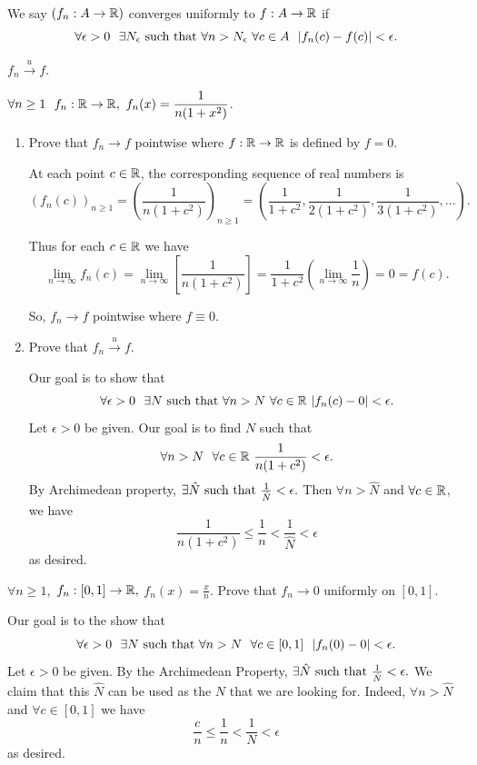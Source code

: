 \begin{definition} \leavevmode \\
    We say $(f_n: A \to \mathbb{R})$ converges uniformly to $f: A \to \mathbb{R}$ if 
    $$\forall \epsilon > 0 ~~\exists N_\epsilon \text{ such that } \forall n > N_\epsilon ~\forall c \in A ~~|f_n(c) - f(c)| < \epsilon.$$
\end{definition}

\begin{notation}
    $f_n \overset{u}{\to} f.$
\end{notation}

\begin{example}
    $\forall n \geq 1~~ f_n: \mathbb{R} \to \mathbb{R}, ~f_n(x) = \dfrac{1}{n(1+x^2)}$.

    \begin{enumerate}
        \item Prove that $f_n \to f$ pointwise where $f: \mathbb{R} \to \mathbb{R}$ is defined by $f = 0.$
        
        At each point $c \in \mathbb{R}$, the corresponding sequence of real numbers is
        $$(f_n(c))_{n \geq 1} = \left(\frac{1}{n(1+c^2)}\right)_{n\geq 1} = \left(\frac{1}{1+c^2}, \frac{1}{2(1+c^2)}, \frac{1}{3(1+c^2)}, ... \right).$$

        Thus for each $c \in \mathbb{R}$ we have
        $$\lim_{n\to \infty}f_n(c) = \lim_{n\to \infty}\left[\frac{1}{n(1+c^2)}\right] = \frac{1}{1+c^2}\left(\lim_{n\to \infty}\frac{1}{n}\right) = 0 = f(c).$$

        So, $f_n \to f$ pointwise where $f \equiv 0$.

        \item Prove that $f_n \overset{u}{\to} f.$
        
        Our goal is to show that
        $$\forall \epsilon > 0 ~~\exists N \text{ such that } \forall n > N ~\forall c \in \mathbb{R} ~|f_n(c) - 0| < \epsilon.$$
        Let $\epsilon > 0$ be given. Our goal is to find $N$ such that
        $$\forall n > N ~~\forall c \in \mathbb{R} ~\frac{1}{n(1+c^2)} < \epsilon.$$
        By Archimedean property, $\exists \hat{N} \text{ such that } \frac{1}{\hat{N}} < \epsilon.$ Then $\forall n > \hat{N}$ and $\forall c \in \mathbb{R}$, we have
        $$\frac{1}{n(1+c^2)} \leq \frac{1}{n} < \frac{1}{\hat{N}} < \epsilon$$
        as desired.
    \end{enumerate}
\end{example}

\begin{example}
    $\forall n \geq 1,$ $f_n:[0,1] \to \mathbb{R},$ $f_n(x) = \frac{x}{n}.$ Prove that $f_n \to 0$ uniformly on $[0,1]$.

    Our goal is to the show that
    $$\forall \epsilon > 0 ~~\exists N \text{ such that } \forall n > N ~~\forall c \in [0,1] ~~ |f_n(0) - 0| < \epsilon.$$
    Let $\epsilon > 0$ be given. By the Archimedean Property, $\exists \hat{N} \text{ such that } \frac{1}{\hat{N}} < \epsilon.$ We claim that this $\hat{N}$ can be used as the $N$ that we are looking for. Indeed, $\forall n > \hat{N}$ and $\forall c \in [0,1]$ we have
    $$\frac{c}{n} \leq \frac{1}{n} < \frac{1}{N} < \epsilon$$
    as desired.
\end{example}

